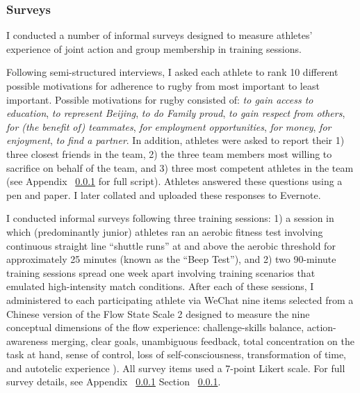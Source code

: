 
  \subsubsection{Surveys}

   I conducted a number of informal surveys designed to measure athletes' experience of joint action and group membership in training sessions.

     Following semi-structured interviews, I asked each athlete to rank 10 different possible motivations for adherence to rugby from most important to least important. Possible motivations for rugby consisted of: \textit{to gain access to education}, \textit{to represent Beijing}, \textit{to do Family proud}, \textit{to gain respect from others}, \textit{for (the benefit of) teammates}, \textit{for employment opportunities}, \textit{for money}, \textit{for enjoyment}, \textit{to find a partner}. In addition, athletes were asked to report their 1) three closest friends in the team, 2) the three team members most willing to sacrifice on behalf of the team, and 3) three most competent athletes in the team (see Appendix ~\ref{} for full script). Athletes answered these questions using a pen and paper. I later collated and uploaded these responses to Evernote.


    I conducted informal surveys following three training sessions: 1) a session in which (predominantly junior) athletes ran an aerobic fitness test involving continuous straight line ``shuttle runs''  at and above the aerobic threshold for approximately 25 minutes (known as the ``Beep Test''), and 2) two 90-minute training sessions spread one week apart involving training scenarios that emulated high-intensity match conditions.  After each of these sessions, I administered to each participating athlete via WeChat nine items selected from a Chinese version of the Flow State Scale 2 \citep{Liu2012} designed to measure the nine conceptual dimensions of the flow experience: challenge-skills balance, action-awareness merging, clear goals, unambiguous feedback, total concentration on the task at hand, sense of control, loss of self-consciousness, transformation of time, and autotelic experience \citep{Csikszentmihalyi1990}).  All survey items used a 7-point Likert scale. For full survey details, see Appendix ~\ref{} Section ~\ref{}.

